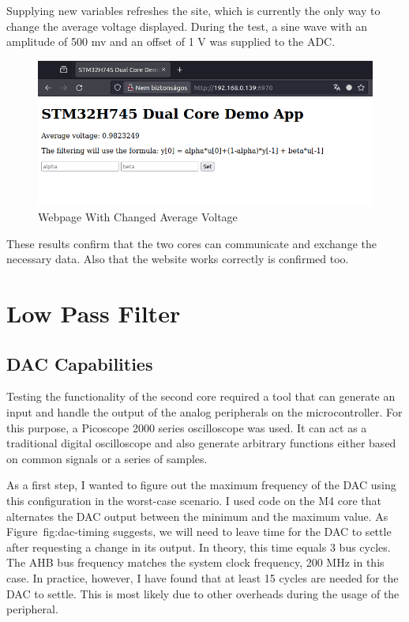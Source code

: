 Supplying new variables refreshes the site, which is currently the only way to change the average voltage displayed. During the test, a sine wave with an amplitude of 500 mv and an offset of 1 V was supplied to the ADC.

\begin{figure}[H]
    \centering
    \includegraphics[width=150mm, keepaspectratio]{figures/webpage-test2.png}
    \caption{Webpage With Changed Average Voltage}
    \label{fig:webpage-test2}
\end{figure}

These results confirm that the two cores can communicate and exchange the necessary data. Also that the website works correctly is confirmed too.

\section{Low Pass Filter}

\subsection{DAC Capabilities}

Testing the functionality of the second core required a tool that can generate an input and handle the output of the analog peripherals on the microcontroller. For this purpose, a Picoscope 2000 series oscilloscope was used. It can act as a traditional digital oscilloscope and also generate arbitrary functions either based on common signals or a series of samples.

As a first step, I wanted to figure out the maximum frequency of the DAC using this configuration in the worst-case scenario. I used code on the M4 core that alternates the DAC output between the minimum and the maximum value. As Figure~{fig:dac-timing} suggests, we will need to leave time for the DAC to settle after requesting a change in its output. In theory, this time equals 3 bus cycles. The AHB bus frequency matches the system clock frequency, 200 MHz in this case. In practice, however, I have found that at least 15 cycles are needed for the DAC to settle. This is most likely due to other overheads during the usage of the peripheral.


